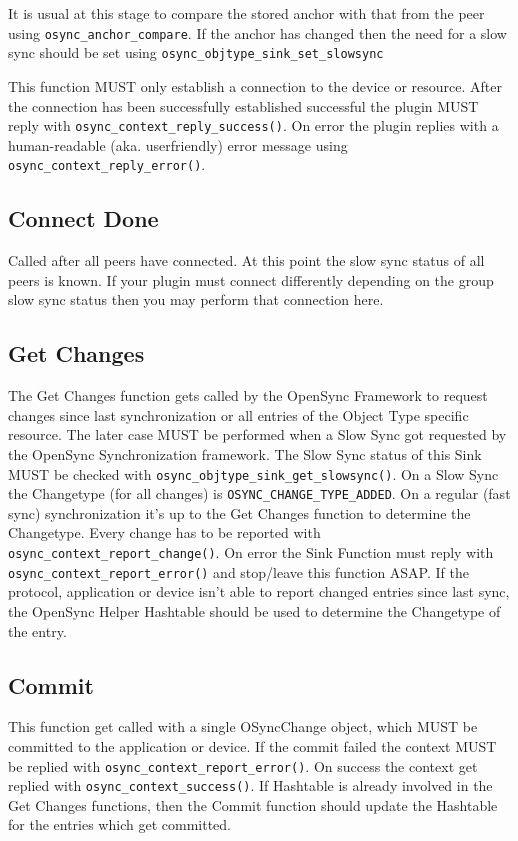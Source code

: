 It is usual at this stage to compare the stored anchor with that from the peer
using \verb|osync_anchor_compare|.  If the anchor has changed then the need for
a slow sync should be set using \verb|osync_objtype_sink_set_slowsync|

This function MUST only establish a connection to the device or resource. After
the connection has been successfully established successful the plugin MUST
reply with \verb|osync_context_reply_success()|. On error the plugin replies
with a human-readable (aka. userfriendly) error message using
\verb|osync_context_reply_error()|.
\subsection{Connect Done}
Called after all peers have connected.  At this point the slow sync status of
all peers is known.  If your plugin must connect differently depending on the
group slow sync status then you may perform that connection here.
\subsection{Get Changes}
The Get Changes function gets called by the OpenSync Framework to request changes
since last synchronization or all entries of the Object Type specific resource.
The later case MUST be performed when a Slow Sync got requested by the OpenSync
Synchronization framework. The Slow Sync status of this Sink MUST be
checked with \verb|osync_objtype_sink_get_slowsync()|. On a Slow Sync the 
Changetype (for all changes) is \verb|OSYNC_CHANGE_TYPE_ADDED|. On a regular 
(fast sync) synchronization it's up to the Get Changes function to determine 
the Changetype. Every change has to be reported with 
\verb|osync_context_report_change()|. On error the Sink Function must
reply with \verb|osync_context_report_error()| and stop/leave this 
function ASAP. If the protocol, application or device isn't able to report 
changed entries since last sync, the OpenSync Helper Hashtable should be used 
to determine the Changetype of the entry.
\subsection{Commit}
This function get called with a single OSyncChange object, which MUST be
committed to the application or device. If the commit failed the context MUST be
replied with \verb|osync_context_report_error()|. On success the context get
replied with \verb|osync_context_success()|. If Hashtable is already involved in
the Get Changes functions, then the Commit function should update the Hashtable
for the entries which get committed.
